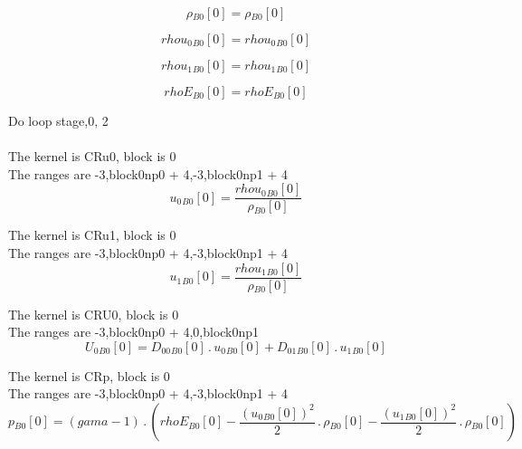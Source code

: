 \documentclass{article}
\begin{document}
\begin{dmath}{\rho{_{B0}}}[{0}] = {\rho{_{B0}}}[{0}]\end{dmath}

\begin{dmath}{rhou_{0}{_{B0}}}[{0}] = {rhou_{0}{_{B0}}}[{0}]\end{dmath}

\begin{dmath}{rhou_{1}{_{B0}}}[{0}] = {rhou_{1}{_{B0}}}[{0}]\end{dmath}

\begin{dmath}{rhoE{_{B0}}}[{0}] = {rhoE{_{B0}}}[{0}]\end{dmath}

\noindent Do loop stage,0, 2\\
\\\noindent The kernel is CRu0, block is 0\\\noindent The ranges are -3,block0np0 + 4,-3,block0np1 + 4\\\begin{dmath}{u_{0}{_{B0}}}[{0}] = \frac{{rhou_{0}{_{B0}}}[{0}]}{{\rho{_{B0}}}[{0}]}\end{dmath}

\noindent The kernel is CRu1, block is 0\\\noindent The ranges are -3,block0np0 + 4,-3,block0np1 + 4\\\begin{dmath}{u_{1}{_{B0}}}[{0}] = \frac{{rhou_{1}{_{B0}}}[{0}]}{{\rho{_{B0}}}[{0}]}\end{dmath}

\noindent The kernel is CRU0, block is 0\\\noindent The ranges are -3,block0np0 + 4,0,block0np1\\\begin{dmath}{U_{0}{_{B0}}}[{0}] = {D_{00}{_{B0}}}[{0}] \,.\, {u_{0}{_{B0}}}[{0}] + {D_{01}{_{B0}}}[{0}] \,.\, {u_{1}{_{B0}}}[{0}]\end{dmath}

\noindent The kernel is CRp, block is 0\\\noindent The ranges are -3,block0np0 + 4,-3,block0np1 + 4\\\begin{dmath}{p{_{B0}}}[{0}] = \left(gama - 1\right) \,.\, \left({rhoE{_{B0}}}[{0}] - \frac{\left({u_{0}{_{B0}}}[{0}] \right)^{2}}{2} \,.\, {\rho{_{B0}}}[{0}] - \frac{\left({u_{1}{_{B0}}}[{0}] \right)^{2}}{2} \,.\, 
{\rho{_{B0}}}[{0}]\right)\end{dmath}
\end{document}
